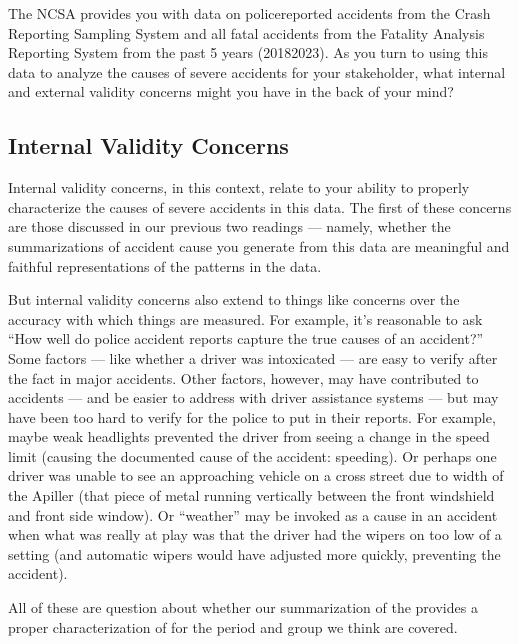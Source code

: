 \documentclass[letterpaper,10pt,english]{jupyterBook}
\begin{document}
\sphinxAtStartPar
The NCSA provides you with data on police\sphinxhyphen{}reported accidents from the Crash Reporting Sampling System and all fatal accidents from the Fatality Analysis Reporting System from the past 5 years (2018\sphinxhyphen{}2023). As you turn to using this data to analyze the causes of severe accidents for your stakeholder, what internal and external validity concerns might you have in the back of your mind?


\subsection{Internal Validity Concerns}
\label{\detokenize{30_questions/15_answering_exploratory_questions:internal-validity-concerns}}
\sphinxAtStartPar
Internal validity concerns, in this context, relate to your ability to properly characterize the causes of severe accidents in this data. The first of these concerns are those discussed in our previous two readings — namely, whether the summarizations of accident cause you generate from this data are meaningful and faithful representations of the patterns in the data.

\sphinxAtStartPar
But internal validity concerns also extend to things like concerns over the accuracy with which things are measured. For example, it’s reasonable to ask “How well do police accident reports capture the true causes of an accident?” Some factors — like whether a driver was intoxicated — are easy to verify after the fact in major accidents. Other factors, however, may have contributed to accidents — and be easier to address with driver assistance systems — but may have been too hard to verify for the police to put in their reports. For example, maybe weak headlights prevented the driver from seeing a change in the speed limit (causing the documented cause of the accident: speeding). Or perhaps one driver was unable to see an approaching vehicle on a cross street due to width of the A\sphinxhyphen{}piller (that piece of metal running vertically between the front windshield and front side window). Or “weather” may be invoked as a cause in an accident when what was really at play was that the driver had the wipers on too low of a setting (and automatic wipers would have adjusted more quickly, preventing the accident).

\sphinxAtStartPar
All of these are question about whether our summarization of the  provides a proper characterization of  for the period and group we think are covered.
\end{document}
